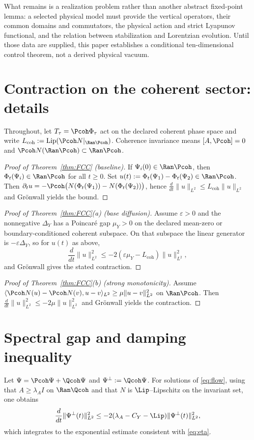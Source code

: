 \documentclass[11pt]{article}
\newcommand{\Aop}{A}
\newcommand{\Ltwo}{\ensuremath{L^{2}}}
\newcommand{\Lcoh}{L_{\mathrm{coh}}}
\begin{document}
What remains is a realization problem rather than another abstract
fixed-point lemma: a selected physical model must provide the vertical
operators, their common domains and commutators, the physical action and
strict Lyapunov functional, and the relation between stabilization and
Lorentzian evolution.  Until those data are supplied, this paper establishes
a conditional ten-dimensional control theorem, not a derived physical
vacuum.

\appendix

\section{Contraction on the coherent sector: details}
Throughout, let $T_\tau=\Pcoh\Phi_\tau$ act on the declared coherent phase
space and write $\Lcoh:=\mathrm{Lip}(\Pcoh N|_{\Ran\Pcoh})$.
Coherence invariance means $[\Aop,\Pcoh]=0$ and $\Pcoh N(\Ran\Pcoh)\subset\Ran\Pcoh$.

\begin{proof}[Proof of Theorem~\ref{thm:FCC} (baseline)]
If $\Psi_i(0)\in\Ran\Pcoh$, then $\Phi_t(\Psi_i)\in\Ran\Pcoh$ for all $t\ge 0$.
Set $u(t):=\Phi_t(\Psi_1)-\Phi_t(\Psi_2)\in\Ran\Pcoh$. Then
$\partial_t u = -\Pcoh\bigl(N(\Phi_t(\Psi_1))-N(\Phi_t(\Psi_2))\bigr)$, hence
$\frac{d}{dt}\|u\|_{\Ltwo}\le \Lcoh\|u\|_{\Ltwo}$ and Grönwall yields the bound.
\end{proof}

\begin{proof}[Proof of Theorem~\ref{thm:FCC}(a) (base diffusion)]
Assume $\varepsilon>0$ and the nonnegative $\Delta_Y$ has a Poincar\'e gap
$\mu_Y>0$ on the declared mean-zero or boundary-conditioned coherent
subspace. On that subspace the linear generator is $-\varepsilon\Delta_Y$,
so for $u(t)$ as above,
\[
\frac{d}{dt}\|u\|_{\Ltwo}^2 \le -2(\varepsilon\mu_Y-\Lcoh)\|u\|_{\Ltwo}^2,
\]
and Grönwall gives the stated contraction.
\end{proof}

\begin{proof}[Proof of Theorem~\ref{thm:FCC}(b) (strong monotonicity)]
Assume $\langle \Pcoh N(u)-\Pcoh N(v),u-v\rangle_{\Ltwo}\ge \mu\|u-v\|_{\Ltwo}^2$ on $\Ran\Pcoh$.
Then $\frac{d}{dt}\|u\|_{\Ltwo}^2\le -2\mu\|u\|_{\Ltwo}^2$ and Grönwall yields the contraction.
\end{proof}

\section{Spectral gap and damping inequality}
Let $\Psi=\Pcoh\Psi+\Qcoh\Psi$ and $\Psi^\perp:=\Qcoh\Psi$. For solutions of \eqref{eq:flow},
using that $\Aop\ge \lambda_{\Aop}I$ on $\Ran\Qcoh$ and that $N$ is $\Lip$--Lipschitz on the invariant set,
one obtains
\[
\frac{d}{dt}\|\Psi^\perp(t)\|_{\Ltwo}^2
\le -2(\lambda_{\Aop}-C_Y-\Lip)\|\Psi^\perp(t)\|_{\Ltwo}^2,
\]
which integrates to the exponential estimate consistent with \eqref{eq:eta}.
\end{document}
